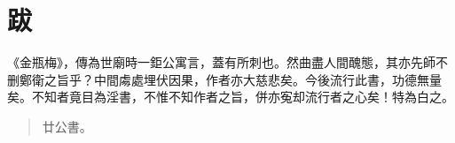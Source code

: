 \chapter*{跋}


《金瓶梅》，傳為世廟時一鉅公寓言，蓋有所刺也。然曲盡人間醜態，其亦先師不删鄭衛之旨乎？中間䖏處埋伏因果，作者亦大慈悲矣。今後流行此書，功德無量矣。不知者竟目為淫書，不惟不知作者之旨，併亦寃却流行者之心矣！特為白之。

\begin{quotation}\begin{flushright}廿公書。\end{flushright}\end{quotation}

